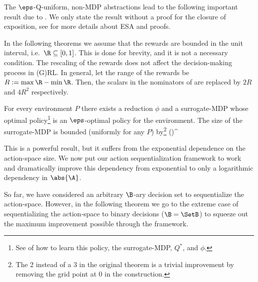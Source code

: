 \documentclass{article} %
\let\thmOrg\theorem
\let\endthmOrg\endtheorem
\renewenvironment{theorem}{\begin{tcolorbox}\thmOrg}{\endthmOrg\end{tcolorbox}}
\begin{document}
The $\eps$-Q-uniform, non-MDP abstractions lead to the following important result due to \citet{Hutter2016}. We only state the result without a proof for the closure of exposition, see \citet{Hutter2016} for more details about ESA and proofs.

In the following theorems we assume that the rewards are bounded in the unit interval, i.e.\ $\R \subseteq [0,1]$. This is done for brevity, and it is not a necessary condition. The rescaling of the rewards does not affect the decision-making process in (G)RL. In general, let the range of the rewards be $R := \max \R - \min \R$. Then, the scalars in the nominators of  are replaced by $2R$ and $4R^2$ respectively.

\begin{theorem}[ESA {\cite[Theorem 11]{Hutter2016}}] \label{thm:esa}
For every environment $P$ there exists a reduction $\phi$ and a surrogate-MDP whose optimal policy\footnote{See \citet{Hutter2016} of how to learn this policy, the surrogate-MDP, $Q^*$, and $\phi$.} is an $\eps$-optimal policy for the environment. The size of the surrogate-MDP is bounded (uniformly for any $P$) by\footnote{The 2 instead of a 3 in the original theorem is a trivial improvement by removing the grid point at 0 in the construction.}
\beqn
\abs{\S} \leq \left(\right)^{\abs{\A}}
\eeqn
\end{theorem}

This is a powerful result, but it suffers from the exponential dependence on the action-space size. We now put our action sequentialization framework to work and dramatically improve this dependency from exponential to only a logarithmic dependency in $\abs{\A}$.

So far, we have considered an arbitrary $\B$-ary decision set to sequentialize the action-space. However, in the following theorem we go to the extreme case of sequentializing the action-space to binary decisions ($\B = \SetB$) to squeeze out the maximum improvement possible through the framework.
\end{document}
